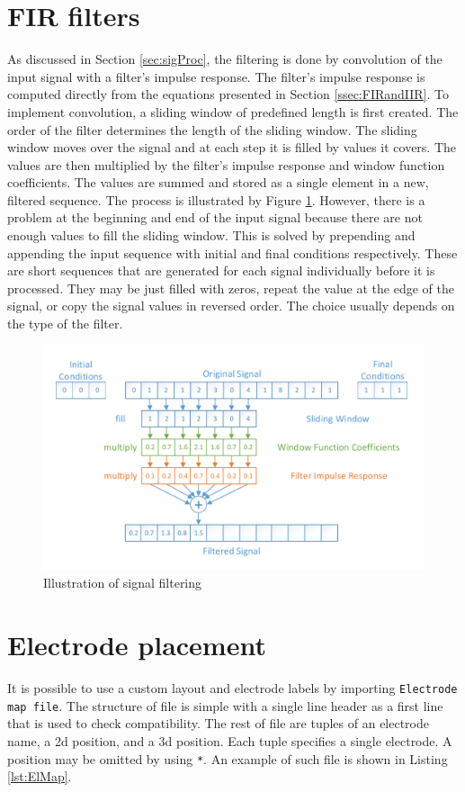 \section{FIR filters}
\label{sec:implFIRfilters}
As discussed in Section \ref{sec:sigProc}, the filtering is done by convolution of the input signal with a filter's impulse response. The filter's impulse response is computed directly from the equations presented in Section \ref{ssec:FIRandIIR}. To implement convolution, a sliding window of predefined length is first created. The order of the filter determines the length of the sliding window. The sliding window moves over the signal and at each step it is filled by values it covers. The values are then multiplied by the filter's impulse response and window function coefficients. The values are summed and stored as a single element in a new, filtered sequence. The process is illustrated by Figure \ref{fig:ImplFilter}. However, there is a problem at the beginning and end of the input signal because there are not enough values to fill the sliding window. This is solved by prepending and appending the input sequence with initial and final conditions respectively. These are short sequences that are generated for each signal individually before it is processed. They may be just filled with zeros, repeat the value at the edge of the signal, or copy the signal values in reversed order. The choice usually depends on the type of the filter.  

\begin{figure}[htb]
	\centering
	\includegraphics[width=1\linewidth]{fig/implFilter.pdf}
	\caption{Illustration of signal filtering}
	\label{fig:ImplFilter}
\end{figure}

\section{Electrode placement}
\label{sec:implElPlacement}
It is possible to use a custom layout and electrode labels by importing \texttt{Electrode map file}. The structure of file is simple with a single line header as a first line that is used to check compatibility. The rest of file are tuples of an electrode name, a \gls{2d} position, and a \gls{3d} position. Each tuple specifies a single electrode. A position may be omitted by using \texttt{*}. An example of such file is shown in Listing \ref{lst:ElMap}.

